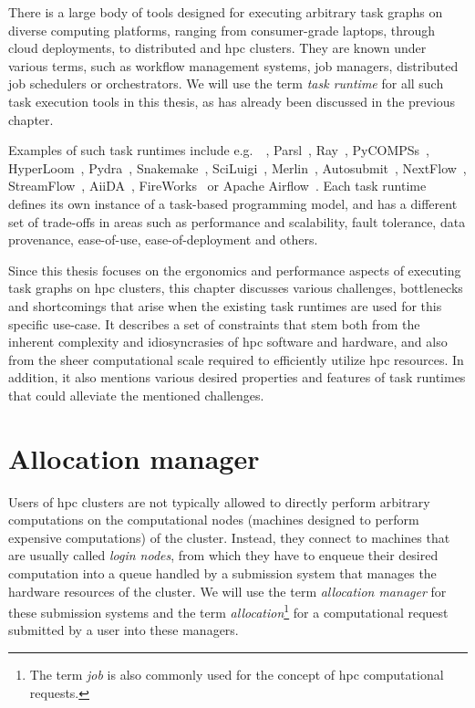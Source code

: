 There is a large body of tools designed for executing arbitrary task graphs on diverse computing
platforms, ranging from consumer-grade laptops, through cloud deployments, to distributed and
\gls{hpc} clusters. They are known under various terms, such as workflow
management systems, job managers, distributed job schedulers or orchestrators. We will use the term
\emph{task runtime} for all such task execution tools in this thesis, as has already been
discussed in the previous chapter.

Examples of such task runtimes include e.g.\ \dask{}~\cite{dask},
Parsl~\cite{parsl}, Ray~\cite{ray},
PyCOMPSs~\cite{pycompss}, HyperLoom~\cite{hyperloom},
Pydra~\cite{pydra}, Snakemake~\cite{snakemake},
SciLuigi~\cite{sciluigi}, Merlin~\cite{merlin},
Autosubmit~\cite{autosubmit}, NextFlow~\cite{nextflow},
StreamFlow~\cite{streamflow}, AiiDA~\cite{aiida},
FireWorks~\cite{fireworks} or Apache Airflow~\cite{airfow}. Each task
runtime defines its own instance of a task-based programming model, and has a different set of
trade-offs in areas such as performance and scalability, fault tolerance, data provenance,
ease-of-use, ease-of-deployment and others.

Since this thesis focuses on the ergonomics and performance aspects of executing task graphs on
\gls{hpc} clusters, this chapter discusses various challenges, bottlenecks and
shortcomings that arise when the existing task runtimes are used for this specific use-case. It
describes a set of constraints that stem both from the inherent complexity and idiosyncrasies of
\gls{hpc} software and hardware, and also from the sheer computational scale
required to efficiently utilize \gls{hpc} resources. In addition, it also mentions
various desired properties and features of task runtimes that could alleviate the mentioned
challenges.

\section{Allocation manager}
\label{sec:allocation-manager}
Users of \gls{hpc} clusters are not typically allowed to directly perform
arbitrary computations on the computational nodes (machines designed to perform expensive
computations) of the cluster. Instead, they connect to machines that are usually called
\emph{login nodes}, from which they have to enqueue their desired computation into a queue
handled by a submission system that manages the hardware resources of the cluster. We will use the
term \emph{allocation manager} for these submission systems and the term
\emph{allocation}\footnote{The term \emph{job} is also commonly used for the concept of
\gls{hpc} computational requests.} for a computational request submitted by a
user into these managers.

